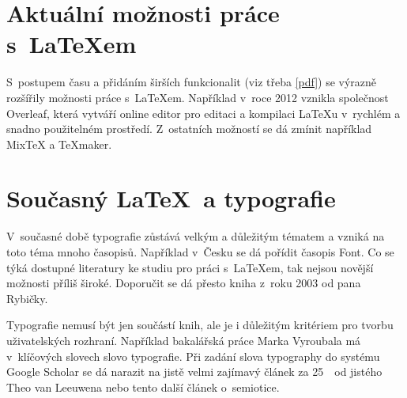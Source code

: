 \documentclass[11pt, a4paper]{article}
\begin{document}
\section{Aktuální možnosti práce s~\LaTeX em}
S~postupem času a přidáním širších funkcionalit (viz třeba \ref{pdf}) se výrazně rozšířily možnosti práce s~\LaTeX em. Například v~roce 2012 vznikla společnost Overleaf, která vytváří online editor pro editaci a kompilaci \LaTeX u v~rychlém a snadno použitelném prostředí\cite{overleaf}. Z~ostatních možností se dá zmínit například MixTeX\cite{miktex} a TeXmaker\cite{texmaker}.

\section{Současný \LaTeX~a typografie}
V~současné době typografie zůstává velkým a důležitým tématem a vzniká na
toto téma mnoho časopisů. Například v~Česku se dá pořídit časopis
Font\cite{casFont}. Co se týká dostupné literatury ke studiu pro práci
s~\LaTeX em, tak nejsou novější možnosti příliš široké. Doporučit se dá přesto
kniha z~roku 2003 od pana Rybičky\cite{rybicka}.

Typografie nemusí být jen součástí knih, ale je i důležitým kritériem pro tvorbu uživatelských rozhraní. Například bakalářská práce Marka Vyroubala\cite{random} má v~klíčových slovech slovo typografie. Při zadání slova typography do systému Google Scholar se dá narazit na jistě velmi zajímavý článek za 25~\texteuro~od jistého Theo van Leeuwena\cite{dutch} nebo tento další článek o~semiotice\cite{semiotic}.
\newpage

\end{document}
